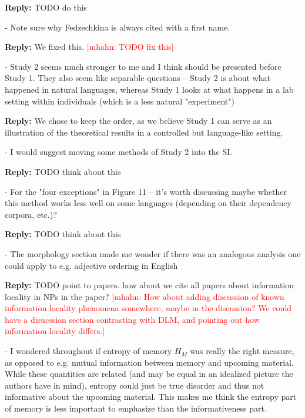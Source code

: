 \documentclass{article}[11pt,a4paper,oneside]
\newcommand\mhahn[1]{\textcolor{red}{[mhahn: #1]}}
\newenvironment{reply}
  {\par\medskip
   \color{blue}%
   \begin{framed}
   \textbf{Reply: }\ignorespaces}
 {\end{framed}
  \medskip}
\begin{document}
\begin{reply}
	TODO do this
\end{reply}

- Note sure why Fedzechkina is always cited with a first name.

\begin{reply}
	We fixed this. \mhahn{TODO fix this}
\end{reply}

- Study 2 seems much stronger to me and I think should be presented before Study 1. They also seem like separable questions -- Study 2 is about what happened in natural languages, whereas Study 1 looks at what happens in a lab setting within individuals (which is a less natural "experiment")

\begin{reply}
We chose to keep the order, as we believe Study 1 can serve as an illustration of the theoretical results in a controlled but language-like setting.
\end{reply}

- I would suggest moving some methods of Study 2 into the SI.

\begin{reply}
	TODO think about this
\end{reply}

- For the "four exceptions" in Figure 11 -- it's worth discussing maybe whether this method works less well on some languages (depending on their dependency corpora, etc.)?

\begin{reply}
	TODO think about this
\end{reply}

- The morphology section made me wonder if there was an analogous analysis one could apply to e.g. adjective ordering in English

\begin{reply}
	TODO point to papers. how about we cite all papers about information locality in NPs in the paper? \mhahn{How about adding discussion of known information locality phenomena somewhere, maybe in the discussion? We could have a disucssion section contrasting with DLM, and pointing out how information locality differs.}
\end{reply}

- I wondered throughout if entropy of memory $H_M$ was really the right measure, as opposed to e.g. mutual information between memory and upcoming material. While these quantities are related (and may be equal in an idealized picture the authors have in mind), entropy could just be true disorder and thus not informative about the upcoming material. This makes me think the entropy part of memory is less important to emphasize than the informativeness part.
\end{document}

